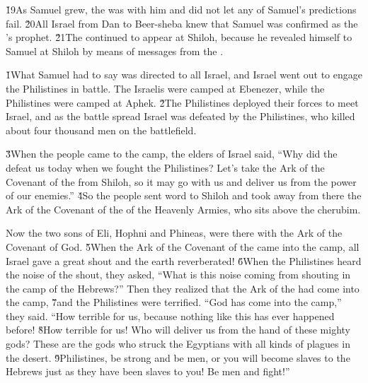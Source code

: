 \v{19}As Samuel grew, the  was with him and did not let any of Samuel's predictions fail. \v{20}All Israel from Dan to Beer-sheba knew that Samuel was confirmed as the 's prophet. \v{21}The  continued to appear at Shiloh, because he revealed himself to Samuel at Shiloh by means of messages from the .

\v{1}What Samuel had to say was directed to all Israel, and Israel went out to engage the Philistines in battle. The Israelis were camped at Ebenezer, while the Philistines were camped at Aphek. \v{2}The Philistines deployed their forces to meet Israel, and as the battle spread Israel was defeated by the Philistines, who killed about four thousand men on the battlefield.

\v{3}When the people came to the camp, the elders of Israel said, ``Why did the  defeat us today when we fought the Philistines? Let's take the Ark of the Covenant of the  from Shiloh, so it may go with us and deliver us from the power of our enemies.'' \v{4}So the people sent word to Shiloh and took away from there the Ark of the Covenant of the  of the Heavenly Armies, who sits above the cherubim.

Now the two sons of Eli, Hophni and Phineas, were there with the Ark of the Covenant of God. \v{5}When the Ark of the Covenant of the  came into the camp, all Israel gave a great shout and the earth reverberated! \v{6}When the Philistines heard the noise of the shout, they asked, ``What is this noise coming from shouting in the camp of the Hebrews?'' Then they realized that the Ark of the  had come into the camp, \v{7}and the Philistines were terrified. ``God has come into the camp,'' they said. ``How terrible for us, because nothing like this has ever happened before! \v{8}How terrible for us! Who will deliver us from the hand of these mighty gods? These are the gods who struck the Egyptians with all kinds of plagues in the desert. \v{9}Philistines, be strong and be men, or you will become slaves to the Hebrews just as they have been slaves to you! Be men and fight!''

